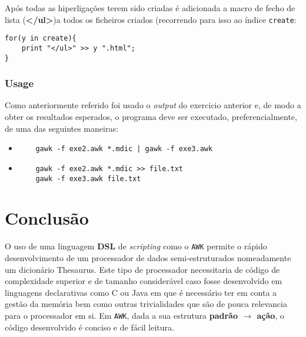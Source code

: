\documentclass{llncs}
\begin{document}
Após todas as hiperligações terem sido criadas é adicionada a macro de fecho de lista (\textbf{</ul>})a todos os ficheiros criados (recorrendo para isso ao índice \texttt{create}:
\begin{verbatim}
for(y in create){
    print "</ul>" >> y ".html";
}
\end{verbatim}

\subsubsection{Usage}
Como anteriormente referido foi usado o \textit{output} do exercicio anterior e, de modo a obter os resultados esperados, o programa deve ser executado, preferencialmente, de uma das seguintes maneiras:
\begin{itemize}
    \item \begin{verbatim}
    gawk -f exe2.awk *.mdic | gawk -f exe3.awk
    \end{verbatim}
    \item \begin{verbatim}
    gawk -f exe2.awk *.mdic >> file.txt
    gawk -f exe3.awk file.txt
    \end{verbatim}
\end{itemize}

\section{Conclusão}
O uso de uma linguagem \textbf{DSL} de \textit{scripting} como o \texttt{AWK} permite o rápido desenvolvimento de um processador de dados semi-estruturados nomeadamente um dicionário Thesaurus. Este tipo de processador necessitaria de código de complexidade superior e de tamanho considerável caso fosse desenvolvido em linguagens declarativas como C ou Java em que é necessário ter em conta a gestão da memória bem como outras trivialidades que são de pouca relevancia para o processador em si. Em \texttt{AWK}, dada a sua estrutura \textbf{padrão $\to$ ação}, o código desenvolvido é conciso e de fácil leitura.
\end{document}
